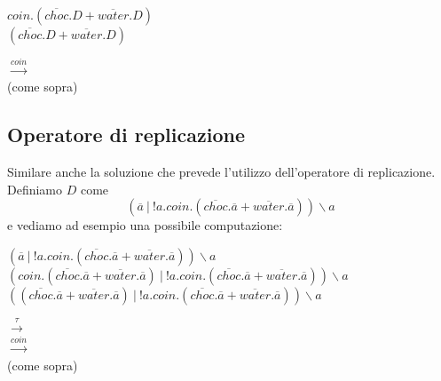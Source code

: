 		\begin{minipage}{0.4\textwidth}
			\begin{flushleft}
				\vspace{5 mm}
				$coin.(\overline{choc}.D + \overline{water}.D)$\\
				\vspace{5 mm}
				$(\overline{choc}.D + \overline{water}.D)$\\
			\end{flushleft}
		\end{minipage}
		\begin{minipage}{0.55\textwidth}
			\begin{flushright}
				\vspace{5 mm}
				$\xrightarrow{coin}$\\
				\vspace{5 mm}
				(come sopra)\\
			\end{flushright}
		\end{minipage}
		
		\subsection{Operatore di replicazione}
		
		Similare \eacc anche la soluzione che prevede l'utilizzo dell'operatore di replicazione. Definiamo $D$ come
		$$(\overline{a}\ |\ !a.coin.(\overline{choc}.\overline{a} + \overline{water}.\overline{a}))\backslash a$$ e vediamo ad esempio una possibile computazione:
		
		\begin{minipage}{0.6\linewidth}
			\begin{flushleft}
				\vspace{5 mm}
				$(\overline{a}\ |\ !a.coin.(\overline{choc}.\overline{a} + \overline{water}.\overline{a}))\backslash a$\\
				\vspace{5 mm}
				$(coin.(\overline{choc}.\overline{a} + \overline{water}.\overline{a})\ |\ !a.coin.(\overline{choc}.\overline{a} + \overline{water}.\overline{a}))\backslash a$\\
				\vspace{7 mm}
				$((\overline{choc}.\overline{a} + \overline{water}.\overline{a})\ |\ !a.coin.(\overline{choc}.\overline{a} + \overline{water}.\overline{a}))\backslash a$
			\end{flushleft}
		\end{minipage}
		\hfill
		\begin{minipage}{0.1\linewidth}
			\begin{flushright}
				\vspace{5 mm}
				$\xrightarrow{\tau}$\\
				\vspace{8 mm}
				$\xrightarrow{coin}$\\
				\vspace{8 mm}
				(come sopra)
			\end{flushright}
		\end{minipage}
		
